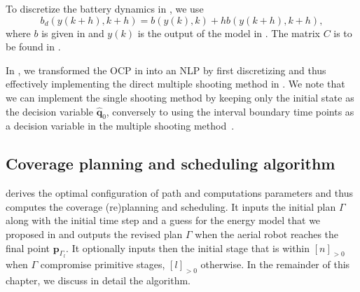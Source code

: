 To discretize the battery dynamics in , we use
\begin{equation}\label{eq:batt-euler}
  b_d(y(k+h),k+h)=b(y(k),k)+hb(y(k+h),k+h),
\end{equation}
where $b$ is given in  and $y(k)$ is the output of the model in . The matrix $C$ is to be found in .

In , we transformed the OCP in  into an NLP by first discretizing and thus effectively implementing the direct multiple shooting method in . We note that we can implement the single shooting method by keeping only the initial state as the decision variable $\hat{\mathbf{q}}_0$, conversely to using the interval boundary time points as a decision variable in the multiple shooting method~\citep{rawlings2017model}.

\subsection{Coverage planning and scheduling algorithm}
\label{sec:algo}

 derives the optimal configuration of path and computations parameters and thus computes the coverage (re)planning and scheduling. It inputs the initial plan $\Gamma$ along with the initial time step and a guess for the energy model that we proposed in  and outputs the revised plan $\Gamma$ when the aerial robot reaches the final point $\mathbf{p}_{\Gamma_l}$. It optionally inputs then the initial stage that is within $[n]_{>0}$ when $\Gamma$ compromise primitive stages, $[l]_{>0}$ otherwise. In the remainder of this chapter, we discuss in detail the algorithm.


